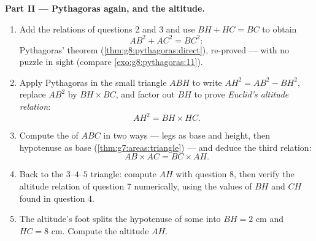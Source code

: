 \begin{problem}[{Weekend problem --- the altitude of a right
triangle: $AB^2 = BH \times BC$, $AH^2 = BH \times HC$, a second
proof of Pythagoras, and a machine for constructing square roots}]
\medskip
\noindent\textbf{Part II --- Pythagoras again, and the altitude.}
\begin{enumerate}[resume]
  \item Add the relations of questions 2 and 3 and use
        $BH + HC = BC$ to obtain
        \[
        AB^2 + AC^2 = BC^2 :
        \]
        Pythagoras' theorem (\cref{thm:g8:pythagoras:direct}),
        re-proved --- with no  puzzle in sight (compare
        \cref{exo:g8:pythagoras:11}).
  \item Apply Pythagoras in the small triangle $ABH$ to write
        $AH^2 = AB^2 - BH^2$, replace $AB^2$ by
        $BH \times BC$, and factor out $BH$ to prove
        \emph{Euclid's altitude relation}:
        \[
        AH^2 = BH \times HC .
        \]
  \item Compute the  of $ABC$ in two ways --- legs as base
        and height, then hypotenuse as base
        (\cref{thm:g7:areas:triangle}) --- and deduce the third
        relation:
        \[
        AB \times AC = BC \times AH .
        \]
  \item Back to the $3$--$4$--$5$ triangle: compute $AH$ with
        question 8, then verify the altitude relation of question
        7 numerically, using the values of $BH$ and $CH$ found in
        question 4.
  \item The altitude's foot splits the hypotenuse of some  into  $BH = 2$ cm and $HC = 8$ cm.
        Compute the altitude $AH$.
\end{enumerate}


\end{problem}
